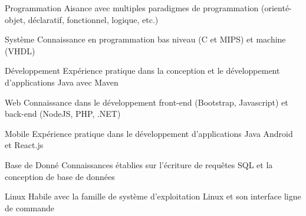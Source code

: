 

\begin{cvskills}

    
  \cvskill
    {Programmation} %
    {Aisance avec multiples paradigmes de programmation (orienté-objet, déclaratif, fonctionnel, logique, etc.)}

  \cvskill
    {Système} %
    {Connaissance en programmation bas niveau (C et MIPS) et machine (VHDL)}

  \cvskill
    {Développement} %
    {Expérience pratique dans la conception et le développement d'applications Java avec Maven}
    
  \cvskill
    {Web} %
    {Connaissance dans le développement front-end (Bootstrap, Javascript) et back-end (NodeJS, PHP, .NET)}
  
  \cvskill
    {Mobile} %
    {Expérience pratique dans le développement d'applications Java Android et React.js}
    
  \cvskill
    {Base de Donné} %
    {Connaissances établies sur l'écriture de requêtes SQL et la conception de base de données}
    
  \cvskill
    {Linux} %
    {Habile avec la famille de système d'exploitation Linux et son interface ligne de commande}

\end{cvskills}
